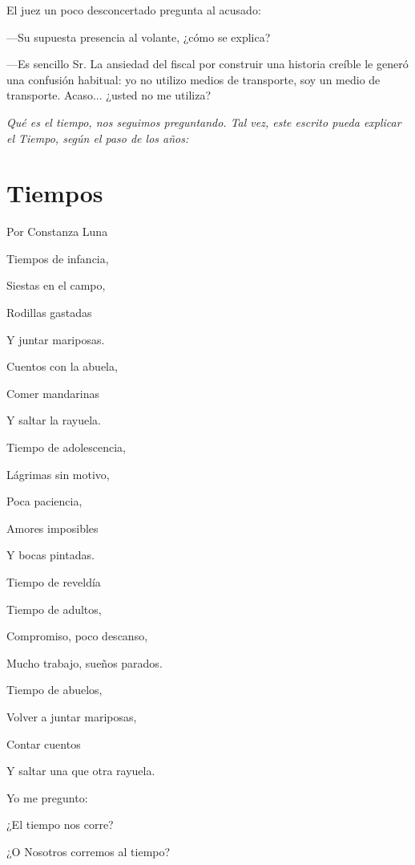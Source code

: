 \documentclass[11pt,twoside,openright,a5paper]{book}
\begin{document}
El juez un poco desconcertado pregunta al acusado: 

---Su supuesta presencia al volante, ¿cómo se explica?

---Es sencillo Sr. La ansiedad del fiscal por construir una historia creíble le generó una confusión habitual: yo no utilizo medios de transporte, soy un medio de transporte. Acaso... ¿usted no me utiliza?

\vspace{0.5cm}

\emph{Qué es el tiempo, nos seguimos preguntando. Tal vez, este escrito pueda explicar el Tiempo, según el paso de los años:}

\clearpage
\section*{Tiempos}

                                                                                              \begin{flushright}Por Constanza Luna\end{flushright}
\begin{center}
Tiempos de infancia,

Siestas en el campo,

Rodillas gastadas

Y juntar mariposas.

Cuentos con la abuela,

Comer mandarinas

Y saltar la rayuela.

Tiempo de adolescencia,

Lágrimas sin motivo,

Poca paciencia,

Amores imposibles

Y bocas pintadas.

Tiempo de reveldía

Tiempo de adultos,

Compromiso, poco descanso,

Mucho trabajo, sueños parados.

Tiempo de abuelos,

Volver a juntar mariposas,

Contar cuentos

Y saltar una que otra rayuela.

Yo me pregunto:

¿El tiempo nos corre?

¿O Nosotros corremos al tiempo? 
\end{center}
\end{document}
